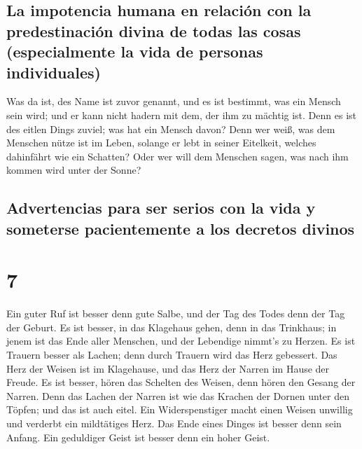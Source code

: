 \hypertarget{la-impotencia-humana-en-relaciuxf3n-con-la-predestinaciuxf3n-divina-de-todas-las-cosas-especialmente-la-vida-de-personas-individuales}{%
\subsection{La impotencia humana en relación con la predestinación
divina de todas las cosas (especialmente la vida de personas
individuales)}\label{la-impotencia-humana-en-relaciuxf3n-con-la-predestinaciuxf3n-divina-de-todas-las-cosas-especialmente-la-vida-de-personas-individuales}}

 Was da ist, des Name ist zuvor genannt, und es ist
bestimmt, was ein Mensch sein wird; und er kann nicht hadern mit dem,
der ihm zu mächtig ist.  Denn es ist des eitlen Dings
zuviel; was hat ein Mensch davon?  Denn wer weiß, was dem
Menschen nütze ist im Leben, solange er lebt in seiner Eitelkeit,
welches dahinfährt wie ein Schatten? Oder wer will dem Menschen sagen,
was nach ihm kommen wird unter der Sonne?

\hypertarget{advertencias-para-ser-serios-con-la-vida-y-someterse-pacientemente-a-los-decretos-divinos}{%
\subsection{Advertencias para ser serios con la vida y someterse
pacientemente a los decretos
divinos}\label{advertencias-para-ser-serios-con-la-vida-y-someterse-pacientemente-a-los-decretos-divinos}}

\hypertarget{section-6}{%
\section{7}\label{section-6}}

 Ein guter Ruf ist besser denn gute Salbe, und der Tag des
Todes denn der Tag der Geburt.  Es ist besser, in das
Klagehaus gehen, denn in das Trinkhaus; in jenem ist das Ende aller
Menschen, und der Lebendige nimmt's zu Herzen.  Es ist
Trauern besser als Lachen; denn durch Trauern wird das Herz gebessert.
 Das Herz der Weisen ist im Klagehause, und das Herz der
Narren im Hause der Freude.  Es ist besser, hören das
Schelten des Weisen, denn hören den Gesang der Narren. 
Denn das Lachen der Narren ist wie das Krachen der Dornen unter den
Töpfen; und das ist auch eitel.  Ein Widerspenstiger macht
einen Weisen unwillig und verderbt ein mildtätiges Herz. 
Das Ende eines Dinges ist besser denn sein Anfang. Ein geduldiger Geist
ist besser denn ein hoher Geist.

